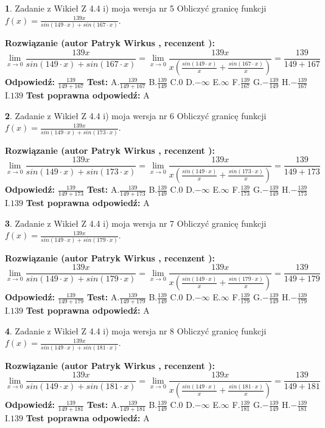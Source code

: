 \documentclass[12pt, a4paper]{article}
\theoremstyle{definition} %
\newtheorem{zad}{}
\newcommand{\zadStart}[1]{\begin{zad}#1\newline}
\newcommand{\zadStop}{\end{zad}}
\newcommand{\rozwStart}[2]{\noindent \textbf{Rozwiązanie (autor #1 , recenzent #2): }\newline}
\newcommand{\rozwStop}{\newline}
\newcommand{\odpStart}{\noindent \textbf{Odpowiedź:}\newline}
\newcommand{\odpStop}{\newline}
\newcommand{\testStart}{\noindent \textbf{Test:}\newline}
\newcommand{\testStop}{\newline}
\newcommand{\kluczStart}{\noindent \textbf{Test poprawna odpowiedź:}\newline}
\newcommand{\kluczStop}{\newline}
\begin{document}
\zadStart{Zadanie z Wikieł Z 4.4 i) moja wersja nr 5}
Obliczyć granicę funkcji $f(x)=\frac{139x}{sin(149\cdot x) +sin(167\cdot x)}$.
\zadStop
\rozwStart{Patryk Wirkus}{}
$$\lim\limits_{x\to 0}\frac{139x}{sin(149\cdot x) +sin(167\cdot x)}=\lim\limits_{x\to 0}\frac{139x}{x(\frac{sin(149\cdot x)}{x}+\frac{sin(167\cdot x)}{x})}=\frac{139}{149+167}$$
\rozwStop
\odpStart
$\frac{139}{149+167}$
\odpStop
\testStart
A.$\frac{139}{149+167}$
B.$\frac{139}{149}$
C.$0$
D.$-\infty$
E.$\infty$
F.$\frac{139}{167}$
G.$-\frac{139}{149}$
H.$-\frac{139}{167}$
I.$139$
\testStop
\kluczStart
A
\kluczStop



\zadStart{Zadanie z Wikieł Z 4.4 i) moja wersja nr 6}
Obliczyć granicę funkcji $f(x)=\frac{139x}{sin(149\cdot x) +sin(173\cdot x)}$.
\zadStop
\rozwStart{Patryk Wirkus}{}
$$\lim\limits_{x\to 0}\frac{139x}{sin(149\cdot x) +sin(173\cdot x)}=\lim\limits_{x\to 0}\frac{139x}{x(\frac{sin(149\cdot x)}{x}+\frac{sin(173\cdot x)}{x})}=\frac{139}{149+173}$$
\rozwStop
\odpStart
$\frac{139}{149+173}$
\odpStop
\testStart
A.$\frac{139}{149+173}$
B.$\frac{139}{149}$
C.$0$
D.$-\infty$
E.$\infty$
F.$\frac{139}{173}$
G.$-\frac{139}{149}$
H.$-\frac{139}{173}$
I.$139$
\testStop
\kluczStart
A
\kluczStop



\zadStart{Zadanie z Wikieł Z 4.4 i) moja wersja nr 7}
Obliczyć granicę funkcji $f(x)=\frac{139x}{sin(149\cdot x) +sin(179\cdot x)}$.
\zadStop
\rozwStart{Patryk Wirkus}{}
$$\lim\limits_{x\to 0}\frac{139x}{sin(149\cdot x) +sin(179\cdot x)}=\lim\limits_{x\to 0}\frac{139x}{x(\frac{sin(149\cdot x)}{x}+\frac{sin(179\cdot x)}{x})}=\frac{139}{149+179}$$
\rozwStop
\odpStart
$\frac{139}{149+179}$
\odpStop
\testStart
A.$\frac{139}{149+179}$
B.$\frac{139}{149}$
C.$0$
D.$-\infty$
E.$\infty$
F.$\frac{139}{179}$
G.$-\frac{139}{149}$
H.$-\frac{139}{179}$
I.$139$
\testStop
\kluczStart
A
\kluczStop



\zadStart{Zadanie z Wikieł Z 4.4 i) moja wersja nr 8}
Obliczyć granicę funkcji $f(x)=\frac{139x}{sin(149\cdot x) +sin(181\cdot x)}$.
\zadStop
\rozwStart{Patryk Wirkus}{}
$$\lim\limits_{x\to 0}\frac{139x}{sin(149\cdot x) +sin(181\cdot x)}=\lim\limits_{x\to 0}\frac{139x}{x(\frac{sin(149\cdot x)}{x}+\frac{sin(181\cdot x)}{x})}=\frac{139}{149+181}$$
\rozwStop
\odpStart
$\frac{139}{149+181}$
\odpStop
\testStart
A.$\frac{139}{149+181}$
B.$\frac{139}{149}$
C.$0$
D.$-\infty$
E.$\infty$
F.$\frac{139}{181}$
G.$-\frac{139}{149}$
H.$-\frac{139}{181}$
I.$139$
\testStop
\kluczStart
A
\kluczStop
\end{document}
